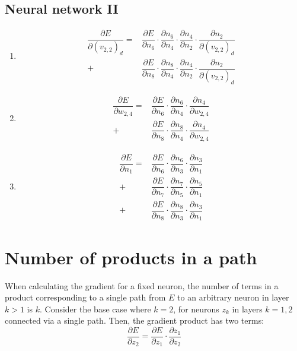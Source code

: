 \documentclass[twocolumn, 9pt]{article}
\newcommand{\del}{\partial}
\begin{document}
\subsection*{Neural network II}
\begin{enumerate}
	\item
		\begin{equation*}
		\begin{split}
			\dfrac{\del E}{\del (v_{2,2})_d} = &\dfrac{\del E}{\del n_6} \cdot \dfrac{\del n_6}{\del n_4} \cdot \dfrac{\del n_4}{\del n_2} \cdot \dfrac{\del n_2}{\del (v_{2,2})_d}\\
			+ &\dfrac{\del E}{\del n_8} \cdot \dfrac{\del n_8}{\del n_4} \cdot \dfrac{\del n_4}{\del n_2} \cdot \dfrac{\del n_2}{\del (v_{2,2})_d}
		\end{split}
		\end{equation*}
	\item
		\begin{equation*}
		\begin{split}
			\dfrac{\del E}{\del w_{2,4}} = &\dfrac{\del E}{\del n_6} \cdot \dfrac{\del n_6}{\del n_4} \cdot \dfrac{\del n_4}{\del w_{2,4}}\\
			+ &\dfrac{\del E}{\del n_8} \cdot \dfrac{\del n_8}{\del n_4} \cdot \dfrac{\del n_4}{\del w_{2,4}}
		\end{split}
		\end{equation*}
	\item
		\begin{equation*}
		\begin{split}
			\dfrac{\del E}{\del n_1} = &\dfrac{\del E}{\del n_6} \cdot \dfrac{\del n_6}{\del n_3} \cdot \dfrac{\del n_3}{\del n_1}\\
			+ &\dfrac{\del E}{\del n_7} \cdot \dfrac{\del n_7}{\del n_5} \cdot \dfrac{\del n_5}{\del n_1}\\
			+ &\dfrac{\del E}{\del n_8} \cdot \dfrac{\del n_8}{\del n_3} \cdot \dfrac{\del n_3}{\del n_1}
		\end{split}
		\end{equation*}
\end{enumerate}
\section{Number of products in a path}
When calculating the gradient for a fixed neuron, the number of terms in a product corresponding to a single path from $E$ to an arbitrary neuron in layer $k>1$ is $k$. Consider the base case where $k=2$, for neurons $z_k$ in layers $k=1,2$ connected via a single path. Then, the gradient product has two terms:
\begin{equation*}
	\dfrac{\del E}{\del z_2} = \dfrac{\del E}{\del z_1} \cdot \dfrac{\del z_1}{\del z_2}
\end{equation*}
\end{document}
